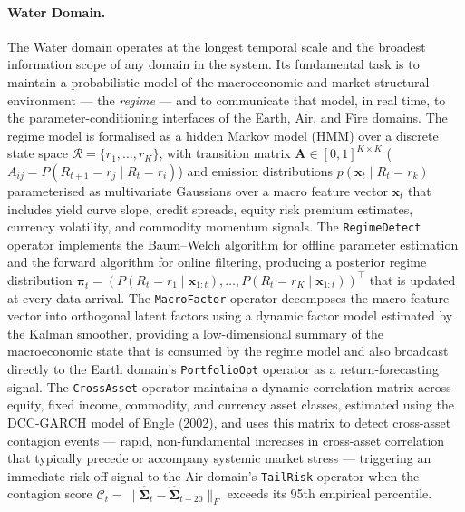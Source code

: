\documentclass[12pt,openany]{book}
\numberwithin{equation}{chapter}
\theoremstyle{plain}
\theoremstyle{definition}
\theoremstyle{remark}
\begin{document}
\paragraph{Water Domain.}
The Water domain operates at the longest temporal scale and the broadest information scope of any domain in the system. Its fundamental task is to maintain a probabilistic model of the macroeconomic and market-structural environment — the \emph{regime} — and to communicate that model, in real time, to the parameter-conditioning interfaces of the Earth, Air, and Fire domains. The regime model is formalised as a hidden Markov model (HMM) over a discrete state space $\mathcal{R} = \{r_1, \ldots, r_K\}$, with transition matrix $\mathbf{A} \in [0,1]^{K \times K}$ ($A_{ij} = P(R_{t+1} = r_j \mid R_t = r_i)$) and emission distributions $p(\mathbf{x}_t \mid R_t = r_k)$ parameterised as multivariate Gaussians over a macro feature vector $\mathbf{x}_t$ that includes yield curve slope, credit spreads, equity risk premium estimates, currency volatility, and commodity momentum signals. The \texttt{RegimeDetect} operator implements the Baum--Welch algorithm for offline parameter estimation and the forward algorithm for online filtering, producing a posterior regime distribution $\boldsymbol{\pi}_t = (P(R_t = r_1 \mid \mathbf{x}_{1:t}), \ldots, P(R_t = r_K \mid \mathbf{x}_{1:t}))^\top$ that is updated at every data arrival. The \texttt{MacroFactor} operator decomposes the macro feature vector into orthogonal latent factors using a dynamic factor model estimated by the Kalman smoother, providing a low-dimensional summary of the macroeconomic state that is consumed by the regime model and also broadcast directly to the Earth domain's \texttt{PortfolioOpt} operator as a return-forecasting signal. The \texttt{CrossAsset} operator maintains a dynamic correlation matrix across equity, fixed income, commodity, and currency asset classes, estimated using the DCC-GARCH model of Engle (2002), and uses this matrix to detect cross-asset contagion events — rapid, non-fundamental increases in cross-asset correlation that typically precede or accompany systemic market stress — triggering an immediate risk-off signal to the Air domain's \texttt{TailRisk} operator when the contagion score $\mathcal{C}_t = \|\hat{\boldsymbol{\Sigma}}_t - \hat{\boldsymbol{\Sigma}}_{t-20}\|_F$ exceeds its 95th empirical percentile.
\end{document}
